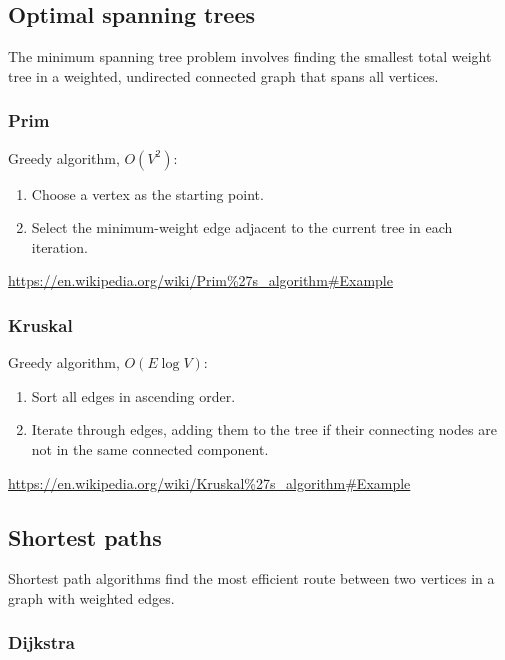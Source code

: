 \documentclass[11pt,journal,compsoc]{IEEEtran}
\begin{document}
\subsection{Optimal spanning trees}

The minimum spanning tree problem involves finding the smallest total weight tree in a weighted, undirected connected graph that spans all vertices.

\subsubsection{Prim}

Greedy algorithm, $O(V^2)$:

\begin{enumerate}
    \item Choose a vertex as the starting point.
    
    \item Select the minimum-weight edge adjacent to the current tree in each iteration.
\end{enumerate}

\url{https://en.wikipedia.org/wiki/Prim%27s_algorithm#Example}

\subsubsection{Kruskal}

Greedy algorithm, $O(E \log V)$:

\begin{enumerate}
    \item Sort all edges in ascending order.
    
    \item Iterate through edges, adding them to the tree if their connecting nodes are not in the same connected component.
\end{enumerate}

\url{https://en.wikipedia.org/wiki/Kruskal%27s_algorithm#Example}

\subsection{Shortest paths}

Shortest path algorithms find the most efficient route between two vertices in a graph with weighted edges.


\subsubsection{Dijkstra}
\end{document}
